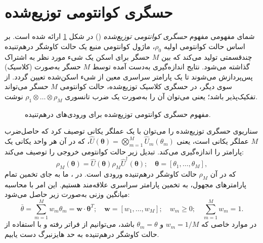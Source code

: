 \section{حسگری کوانتومی توزیع‌شده}
\label{sec:11-3}
شمای مفهومی مفهوم \textit{حسگری کوانتومی توزیع‌شده} () \cite{20, 25, 26} در شکل \ref{fig:11-3} ارائه شده است. بر اساس حالت کوانتومی اولیه $\rho_0$، ماژول کوانتومی منبع یک حالت کاوشگر درهم‌تنیده چندقسمتی تولید می‌کند که بین $M$ حسگر برای اسکن یک شیء مورد نظر به اشتراک گذاشته می‌شود. نتایج اندازه‌گیری به‌دست آمده توسط $M$ حسگر به‌صورت (کلاسیک) پس‌پردازش می‌شوند تا یک پارامتر سراسری معین از شیء اسکن‌شده تعیین گردد. از سوی دیگر، در حسگری کلاسیک توزیع‌شده، حالت کوانتومی $M$ حسگر می‌تواند تفکیک‌پذیر باشد؛ یعنی می‌توان آن را به‌صورت یک ضرب تانسوری $\rho_1 \otimes \dots \otimes \rho_M$ نوشت.

\begin{figure}[ht]
	\centering
	\caption{مفهوم حسگری کوانتومی توزیع‌شده برای ورودی‌های درهم‌تنیده.}
	\label{fig:11-3}
\end{figure}

سناریوی حسگری توزیع‌شده را می‌توان با یک عملگر یکانی توصیف کرد که حاصل‌ضرب $M$ عملگر یکانی است، یعنی $\hat{U}(\bm{\theta}) = \bigotimes_{m=1}^{M} \hat{U}_m(\theta_m)$، که در آن هر واحد یکانی یک پارامتر را اندازه‌گیری می‌کند. تبدیل زیر حالت کوانتومی خروجی را توصیف می‌کند:
\begin{equation}
	\rho_M(\bm{\theta}) = \hat{U}(\bm{\theta}) \rho_M \hat{U}^\dagger(\bm{\theta}); \quad \bm{\theta} = [\theta_1, \dots, \theta_M],
	\label{eq:11-52}
\end{equation}
که در آن $\rho_M$ حالت کاوشگر درهم‌تنیده ورودی است. در ، ما به جای تخمین تمام پارامترهای مجهول، به تخمین پارامتر سراسری علاقه‌مند هستیم. این امر با محاسبه میانگین وزنی به‌صورت زیر حاصل می‌شود:
\begin{equation}
	\bar{\theta} = \sum_{m=1}^{M} w_m \theta_m = \bm{w} \cdot \bm{\theta}^T; \quad \bm{w} = [w_1, \dots, w_M]; \quad w_m \geq 0; \quad \sum_{m=1}^{M} w_m = 1.
	\label{eq:11-53}
\end{equation}
در موارد خاصی که $w_m = 1/M$ و $\theta_m = \theta$ باشد، می‌توانیم از  فراتر رفته و با استفاده از حالت کاوشگر درهم‌تنیده به حد هایزنبرگ دست یابیم.

